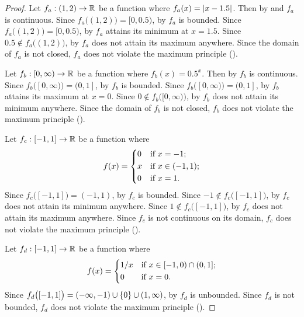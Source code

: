 \begin{proof}
  Let \(f_a : (1, 2) \to \mathbb{R}\) be a function where \(f_a(x) = \left\lvert x - 1.5\right\rvert\).
  Then by  and  \(f_a\) is continuous.
  Since \(f_a\big((1, 2)\big) = [0, 0.5)\), by  \(f_a\) is bounded.
  Since \(f_a\big((1, 2)\big) = [0, 0.5)\), by  \(f_a\) attains its minimum at \(x = 1.5\).
  Since \(0.5 \notin f_a\big((1, 2)\big)\), by  \(f_a\) does not attain its maximum anywhere.
  Since the domain of \(f_a\) is not closed, \(f_a\) does not violate the maximum principle ().

  Let \(f_b : [0, \infty) \to \mathbb{R}\) be a function where \(f_b(x) = 0.5^x\).
  Then by  \(f_b\) is continuous.
  Since \(f_b\big([0, \infty)\big) = (0, 1]\), by  \(f_b\) is bounded.
  Since \(f_b\big([0, \infty)\big) = (0, 1]\), by  \(f_b\) attains its maximum at \(x = 0\).
  Since \(0 \notin f_b\big([0, \infty)\big)\), by  \(f_b\) does not attain its minimum anywhere.
  Since the domain of \(f_b\) is not closed, \(f_b\) does not violate the maximum principle ().

  Let \(f_c : [-1, 1] \to \mathbb{R}\) be a function where
  \[
    f(x) = \begin{dcases}
      0 & \text{if } x = -1;        \\
      x & \text{if } x \in (-1, 1); \\
      0 & \text{if } x = 1.
    \end{dcases}
  \]
  Since \(f_c\big([-1, 1]\big) = (-1, 1)\), by  \(f_c\) is bounded.
  Since \(-1 \notin f_c\big([-1, 1]\big)\), by  \(f_c\) does not attain its minimum anywhere.
  Since \(1 \notin f_c\big([-1, 1]\big)\), by  \(f_c\) does not attain its maximum anywhere.
  Since \(f_c\) is not continuous on its domain, \(f_c\) does not violate the maximum principle ().

  Let \(f_d : [-1, 1] \to \mathbb{R}\) be a function where
  \[
    f(x) = \begin{dcases}
      1 / x & \text{if } x \in [-1, 0) \cap (0, 1]; \\
      0     & \text{if } x = 0.
    \end{dcases}
  \]
  Since \(f_d\big([-1, 1]\big) = (-\infty, -1) \cup \left\lbrace0\right\rbrace \cup (1, \infty)\), by  \(f_d\) is unbounded.
  Since \(f_d\) is not bounded, \(f_d\) does not violate the maximum principle ().
\end{proof}

